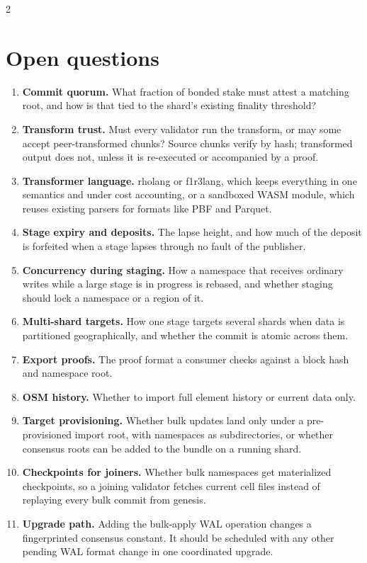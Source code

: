\documentclass[10pt]{article}
\begin{document}
\begin{multicols}{2}

\section{Open questions}\label{sec:open}

\begin{enumerate}
\item \textbf{Commit quorum.} What fraction of bonded stake must attest a matching
  root, and how is that tied to the shard's existing finality threshold?
\item \textbf{Transform trust.} Must every validator run the transform, or may some
  accept peer-transformed chunks? Source chunks verify by hash; transformed output
  does not, unless it is re-executed or accompanied by a proof.
\item \textbf{Transformer language.} rholang or f1r3lang, which keeps everything
  in one semantics and under cost accounting, or a sandboxed WASM module, which
  reuses existing parsers for formats like PBF and Parquet.
\item \textbf{Stage expiry and deposits.} The lapse height, and how much of the
  deposit is forfeited when a stage lapses through no fault of the publisher.
\item \textbf{Concurrency during staging.} How a namespace that receives ordinary
  writes while a large stage is in progress is rebased, and whether staging should
  lock a namespace or a region of it.
\item \textbf{Multi-shard targets.} How one stage targets several shards when data
  is partitioned geographically, and whether the commit is atomic across them.
\item \textbf{Export proofs.} The proof format a consumer checks against a block
  hash and namespace root.
\item \textbf{OSM history.} Whether to import full element history or current
  data only.
\item \textbf{Target provisioning.} Whether bulk updates land only under a
  pre-provisioned import root, with namespaces as subdirectories, or whether
  consensus roots can be added to the bundle on a running shard.
\item \textbf{Checkpoints for joiners.} Whether bulk namespaces get materialized
  checkpoints, so a joining validator fetches current cell files instead of
  replaying every bulk commit from genesis.
\item \textbf{Upgrade path.} Adding the bulk-apply WAL operation changes a
  fingerprinted consensus constant. It should be scheduled with any other pending
  WAL format change in one coordinated upgrade.
\end{enumerate}


\end{multicols}
\end{document}
